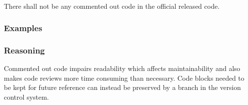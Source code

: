 \subsection*{\codingRule{}}

There shall not be any commented out code in the official released code.

\subsubsection*{Examples}

\noindent
\begin{minipage}[t]{\codelstwidth\linewidth}
    
\end{minipage}
\hfill
\begin{minipage}[t]{\codelstwidth\linewidth}
    
\end{minipage}

\subsubsection*{Reasoning}

Commented out code impairs readability which affects maintainability and also makes code reviews more time consuming than necessary. Code blocks needed to be kept for future reference can instead be preserved by a branch in the version control system.
